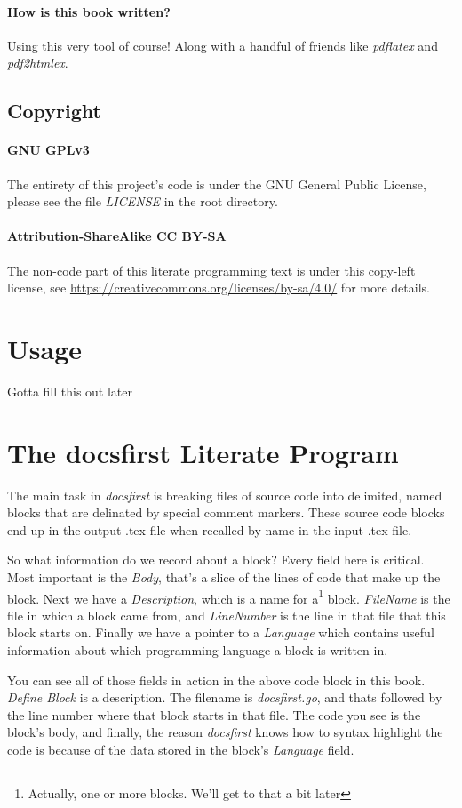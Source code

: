 \documentclass{article}
\begin{document}
\paragraph{How is this book written?} Using this very tool of course! Along with
a handful of friends like \emph{pdflatex} and \emph{pdf2htmlex}.

\subsection{Copyright}

\paragraph{GNU GPLv3} The entirety of this project's code is under the GNU
General Public License, please see the file \emph{LICENSE} in the root
directory.


\paragraph{Attribution-ShareAlike CC BY-SA} The non-code part of this
literate programming text is under this copy-left license, see
\url{https://creativecommons.org/licenses/by-sa/4.0/} for more details.

\section{Usage}

Gotta fill this out later

\section{The docsfirst Literate Program}

The main task in \emph{docsfirst} is breaking files of source code into delimited,
named blocks that are delinated by special comment markers. These source code
blocks end up in the output .tex file when recalled by name in the input .tex
file.


So what information do we record about a block? Every field here is critical.
Most important is the \emph{Body}, that's a slice of the lines of code that make
up the block. Next we have a \emph{Description}, which is a name for
a\footnote{Actually, one or more blocks. We'll get to that a bit later} block.
\emph{FileName} is the file in which a block came from, and \emph{LineNumber}
is the line in that file that this block starts on. Finally we have a pointer to
a \emph{Language} which contains useful information about which programming
language a block is written in.

You can see all of those fields in action in the above code block in this book.
\emph{Define Block} is a description. The filename is \emph{docsfirst.go}, and
thats followed by the line number where that block starts in that file. The code
you see is the block's body, and finally, the reason \emph{docsfirst} knows how
to syntax highlight the code is because of the data stored in the block's
\emph{Language} field.
\end{document}
